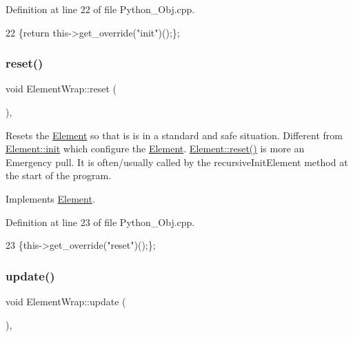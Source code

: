 Definition at line 22 of file Python\+\_\+\+Obj.\+cpp.


\begin{DoxyCode}
22 \{\textcolor{keywordflow}{return} this->get\_override(\textcolor{stringliteral}{"init"})();\};
\end{DoxyCode}
\mbox{\label{structElementWrap_a69a4588be73b8c85ddb92b13f74c3a12}} 
\subsubsection{\texorpdfstring{reset()}{reset()}}
{\footnotesize\ttfamily void Element\+Wrap\+::reset (\begin{DoxyParamCaption}{ }\end{DoxyParamCaption})\hspace{0.3cm}{\ttfamily [inline]}, {\ttfamily [virtual]}}

Resets the \hyperlink{classElement}{Element} so that is is in a standard and safe situation. Different from \hyperlink{classElement_af42754b5cabc198869222725218d695c}{Element\+::init} which configure the \hyperlink{classElement}{Element}. \hyperlink{classElement_a69efffa22f06909d768149715565cb56}{Element\+::reset()} is more an Emergency pull. It is often/usually called by the recursive\+Init\+Element method at the start of the program. 

Implements \hyperlink{classElement_a69efffa22f06909d768149715565cb56}{Element}.



Definition at line 23 of file Python\+\_\+\+Obj.\+cpp.


\begin{DoxyCode}
23 \{this->get\_override(\textcolor{stringliteral}{"reset"})();\};
\end{DoxyCode}
\mbox{\label{structElementWrap_a13d2d2771d1dd305abf3457f98482cbe}} 
\subsubsection{\texorpdfstring{update()}{update()}}
{\footnotesize\ttfamily void Element\+Wrap\+::update (\begin{DoxyParamCaption}{ }\end{DoxyParamCaption})\hspace{0.3cm}{\ttfamily [inline]}, {\ttfamily [virtual]}}

